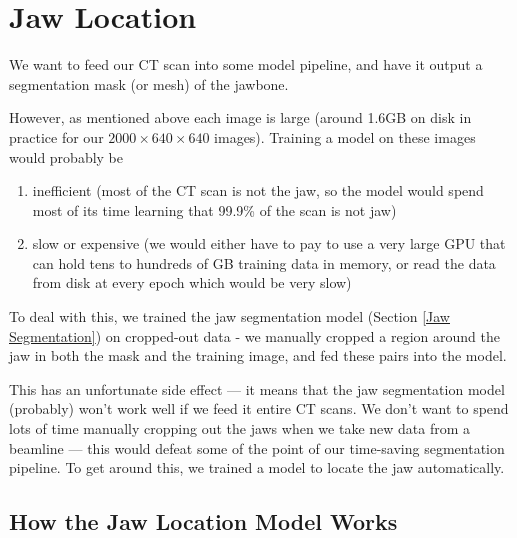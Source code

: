 \documentclass[12pt]{article}
\begin{document}
\section{Jaw Location}
\label{Jaw Location}
We want to feed our CT scan into some model pipeline, and have it output a segmentation mask (or mesh) of the jawbone.

However, as mentioned above each image is large (around 1.6GB on disk in practice for our $2000\times 640\times 640$ images).
Training a model on these images would probably be
\begin{enumerate}
    \item inefficient (most of the CT scan is not the jaw, so the model would spend most of its time learning that 99.9\% of the scan is not jaw)
    \item slow or expensive (we would either have to pay to use a very large GPU that can hold tens to hundreds of GB training data in memory, or read the data from disk at every epoch which would be very slow)
\end{enumerate}
To deal with this, we trained the jaw segmentation model (Section \ref{Jaw Segmentation}) on cropped-out data -
we manually cropped a region around the jaw in both the mask and the training image, and fed these pairs into the model.

This has an unfortunate side effect --- it means that the jaw segmentation model (probably) won't work well if we feed it
entire CT scans.
We don't want to spend lots of time manually cropping out the jaws when we take new data from a beamline --- this would defeat
some of the point of our time-saving segmentation pipeline.
To get around this, we trained a model to locate the jaw automatically.

\subsection{How the Jaw Location Model Works}
\end{document}

